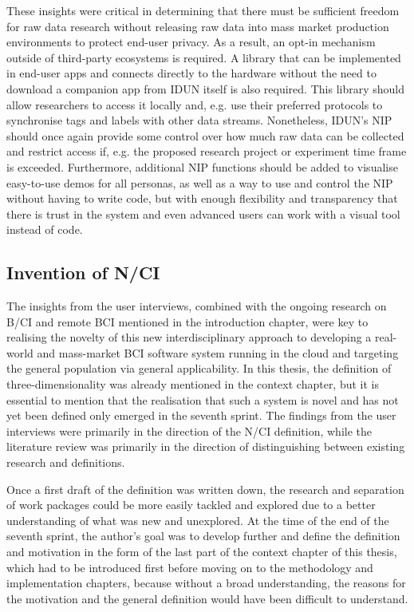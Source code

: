 These insights were critical in determining that there must be sufficient freedom for raw data research without releasing raw data into mass market production environments to protect end-user privacy. As a result, an opt-in mechanism outside of third-party ecosystems is required. A library that can be implemented in end-user apps and connects directly to the hardware without the need to download a companion app from IDUN itself is also required. This library should allow researchers to access it locally and, e.g. use their preferred protocols to synchronise tags and labels with other data streams. Nonetheless, IDUN's NIP should once again provide some control over how much raw data can be collected and restrict access if, e.g. the proposed research project or experiment time frame is exceeded. Furthermore, additional NIP functions should be added to visualise easy-to-use demos for all personas, as well as a way to use and control the NIP without having to write code, but with enough flexibility and transparency that there is trust in the system and even advanced users can work with a visual tool instead of code.

\subsection{Invention of N/CI}
\label{chapter4-invention-of-nci}

The insights from the user interviews, combined with the ongoing research on B/CI and remote BCI mentioned in the introduction chapter, were key to realising the novelty of this new interdisciplinary approach to developing a real-world and mass-market BCI software system running in the cloud and targeting the general population via general applicability. In this thesis, the definition of three-dimensionality was already mentioned in the context chapter, but it is essential to mention that the realisation that such a system is novel and has not yet been defined only emerged in the seventh sprint. The findings from the user interviews were primarily in the direction of the N/CI definition, while the literature review was primarily in the direction of distinguishing between existing research and definitions.

Once a first draft of the definition was written down, the research and separation of work packages could be more easily tackled and explored due to a better understanding of what was new and unexplored. At the time of the end of the seventh sprint, the author's goal was to develop further and define the definition and motivation in the form of the last part of the context chapter of this thesis, which had to be introduced first before moving on to the methodology and implementation chapters, because without a broad understanding, the reasons for the motivation and the general definition would have been difficult to understand.

